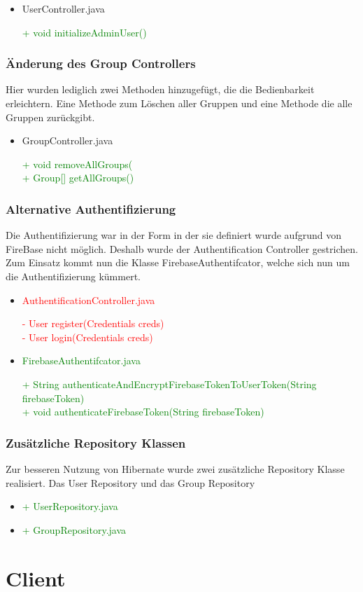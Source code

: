 \documentclass[a4paper]{scrreprt}
\begin{document}
\begin{itemize}
\item{UserController.java}

\textcolor{green}{+ void initializeAdminUser()}\\
\end{itemize}

\subsubsection{Änderung des Group Controllers}
Hier wurden lediglich zwei Methoden hinzugefügt, die die Bedienbarkeit erleichtern. Eine Methode zum Löschen aller Gruppen und eine Methode die alle Gruppen zurückgibt.

\begin{itemize}
\item{GroupController.java}

\textcolor{green}{+ void removeAllGroups(}\\
\textcolor{green}{+ Group[] getAllGroups()}\\
\end{itemize}

\subsubsection{Alternative Authentifizierung}
Die Authentifizierung war in der Form in der sie definiert wurde aufgrund von FireBase nicht möglich. Deshalb wurde der Authentification Controller gestrichen. Zum Einsatz kommt nun die Klasse FirebaseAuthentifcator, welche sich nun um die Authentifizierung kümmert.

\begin{itemize}
\item\textcolor{red}{AuthentificationController.java}

\textcolor{red}{- User register(Credentials creds)}\\
\textcolor{red}{- User login(Credentials creds)}\\

\item\textcolor{green}{FirebaseAuthentifcator.java}

\textcolor{green}{+ String authenticateAndEncryptFirebaseTokenToUserToken(String firebaseToken)}\\
\textcolor{green}{+ void authenticateFirebaseToken(String firebaseToken)}
\end{itemize}

\subsubsection{Zusätzliche Repository Klassen}
Zur besseren Nutzung von Hibernate wurde zwei zusätzliche Repository Klasse realisiert. Das User Repository und das Group Repository

\begin{itemize}
\item\textcolor{green}{+ UserRepository.java}
\item\textcolor{green}{+ GroupRepository.java}
\end{itemize}


\section{Client}





\printglossaries
\end{document}
